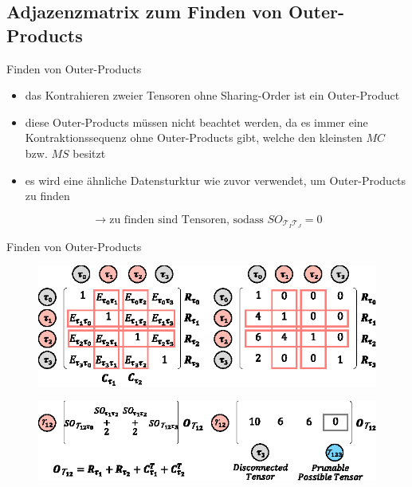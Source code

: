 \documentclass{beamer}
\newcommand{\Tau}{\bm{\mathcal{T}}}
\begin{document}
\subsection{Adjazenzmatrix zum Finden von Outer-Products}
\begin{frame}{Finden von Outer-Products}
	\begin{itemize}
		\item das Kontrahieren zweier Tensoren ohne Sharing-Order ist ein Outer-Product
		\item diese Outer-Products müssen nicht beachtet werden, da es immer eine Kontraktionssequenz ohne Outer-Products gibt, welche den kleinsten $MC$ bzw. $MS$ besitzt\cite{outerProduct}
		\item es wird eine ähnliche Datensturktur wie zuvor verwendet, um Outer-Products zu finden
	\end{itemize} \pause
	\begin{equation*}
		\rightarrow \text{zu finden sind Tensoren, sodass } SO_{\Tau_I \Tau_J} = 0
	\end{equation*}
\end{frame}

\begin{frame}{Finden von Outer-Products}
	\begin{figure}
		\includegraphics[scale=1.1]{figure_05_e_g}
	\end{figure} \pause
	\begin{figure}
		\includegraphics[scale=1.2]{figure_05_f_h}
	\end{figure}
\end{frame}
\end{document}
